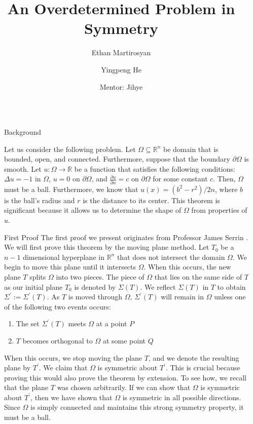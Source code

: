 \documentclass[final]{beamer}
\title{An Overdetermined Problem in Symmetry}
\author{Ethan Martirosyan \and Yingpeng He \and Mentor: Jihye}
\institute[shortinst]{University of California Santa Barbara}
\newlength{\sepwidth}
\newlength{\colwidth}
\newcommand{\separatorcolumn}{\begin{column}{\sepwidth}\end{column}}
\begin{document}
\begin{frame}[t]
\begin{columns}[t]
\separatorcolumn

\begin{column}{\colwidth}

  \begin{block}{Background}

    Let us consider the following problem. Let $\Omega \subseteq \mathbb{R}^n$ be domain that is bounded, open, and connected. Furthermore, suppose that the boundary $\partial{\Omega}$ is smooth. Let $u: \Omega \rightarrow \mathbb{R}$ be a function that satisfies the following conditions: $\Delta u = -1$ in $\Omega$, $u=0$ on $\partial{\Omega}$, and $\frac{\partial{u}}{\partial{n}} = c$ on $\partial{\Omega}$ for some constant $c$. Then, $\Omega$ must be a ball. Furthermore, we know that $u(x) = (b^2-r^2)/2n$, where $b$ is the ball's radius and $r$ is the distance to its center. This theorem is significant because it allows us to determine the shape of $\Omega$ from properties of $u$.

 
  \end{block}

  \begin{block}{First Proof}
The first proof we present originates from Professor James Serrin \cite{serrin71}.
    We will first prove this theorem by the moving plane method. Let $T_0$ be a $n-1$ dimensional hyperplane in $\mathbb{R}^n$ that does not intersect the domain $\Omega$. We begin to move this plane until it intersects $\Omega$. When this occurs, the new plane $T$ splits $\Omega$ into two pieces. The piece of $\Omega$ that lies on the same side of $T$ as our initial plane $T_0$ is denoted by $\Sigma(T)$. We reflect $\Sigma(T)$ in $T$ to obtain $\Sigma^\prime := \Sigma^\prime(T)$. As $T$ is moved through $\Omega$, $\Sigma^\prime(T)$ will remain in $\Omega$ unless one of the following two events occurs:
    \begin{enumerate}[]
        \item The set $\Sigma^\prime(T)$ meets $\Omega$ at a point $P$
        \item $T$ becomes orthogonal to $\Omega$ at some point $Q$
    \end{enumerate} When this occurs, we stop moving the plane $T$, and we denote the resulting plane by $T^\prime$. We claim that $\Omega$ is symmetric about $T^\prime$. This is crucial because proving this would also prove the theorem by extension. To see how, we recall that the plane $T$ was chosen arbitrarily. If we can show that $\Omega$ is symmetric about $T^\prime$, then we have shown that $\Omega$ is symmetric in all possible directions. Since $\Omega$ is simply connected and maintains this strong symmetry property, it must be a ball.
   

\end{block}
\end{column}
\end{columns}
\end{frame}
\end{document}
